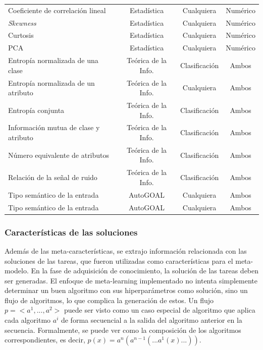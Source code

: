 \begin{center}
\begin{longtable}{l|c|c|c}
		Coeficiente de correlación lineal & Estadística & Cualquiera & Numérico \\ 
		\textit{Skewness} & Estadística & Cualquiera & Numérico \\
		Curtosis & Estadística & Cualquiera & Numérico \\ 
		PCA & Estadística & Cualquiera & Numérico \\ \hline 
		Entropía normalizada de una clase & Teórica de la Info. & Clasificación & Ambos \\ 
		Entropía normalizada de un atributo & Teórica de la Info. & Cualquiera & Ambos \\
		Entropía conjunta & Teórica de la Info. & Clasificación & Ambos \\ 
		Información mutua de clase y atributo & Teórica de la Info. & Clasificación & Ambos \\ 
		Número equivalente de atributos & Teórica de la Info. & Clasificación & Ambos \\ 
		Relación de la señal de ruido & Teórica de la Info. & Clasificación & Ambos \\ \hline
		Tipo semántico de la entrada & AutoGOAL & Cualquiera & Ambos \\
		Tipo semántico de la entrada & AutoGOAL & Cualquiera & Ambos \\ \hline
	\end{longtable}
\end{center}

\subsubsection{Características de las soluciones}\label{subsub:soluciones}

Además de las meta-características, se extrajo información relacionada con las soluciones de las tareas, que fueron utilizadas como características para el meta-modelo. En la fase de adquisición de conocimiento, la solución de las tareas deben ser generadas. El enfoque de meta-learning implementado no intenta simplemente determinar un buen algoritmo con sus hiperparámetros como solución, sino un flujo de algoritmos, lo que complica la generación de estos. Un flujo $p = <a^1, ..., a^2>$  puede ser visto como un caso especial de algoritmo que aplica cada algoritmo $a^i$ de forma secuencial a la salida del algoritmo anterior en la secuencia. Formalmente, se puede ver como la composición de los algoritmos correspondientes, es decir, $p(x) = a^n(a^{n-1}(...a^1(x)...))$.


